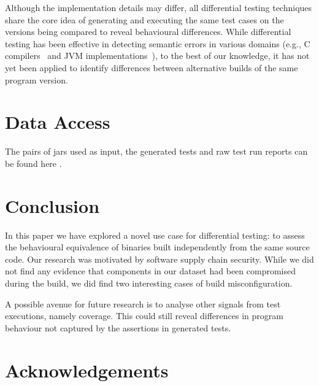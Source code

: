 \documentclass[conference]{IEEEtran}
\newcommand{\jens}[1]{\textbf{\textcolor{magenta}{[ \ding{46}Jens: #1]}}}
\renewcommand{\jens}[1]{}
\begin{document}
Although the implementation details may differ, all differential testing techniques share the core idea of generating and executing the same test cases on the versions being compared to reveal behavioural differences. %
While differential testing has been effective in detecting semantic errors in various domains (e.g., C compilers~\cite{Yang:compiler:pldi:2011} and JVM implementations~\cite{Chen:jvmdiff:pldi:2016}), to the best of our knowledge, it has not yet been applied to identify differences between alternative builds of the same program version.


\section{Data Access}
\label{sec:dataaccess}

The pairs of jars used as input, the generated tests and raw test run reports can be found here \jens{@Tim todo}. 


\section{Conclusion}
\label{sec:conclusion}

In this paper we have explored a novel use case for differential testing: to assess the behavioural equivalence of binaries built independently from the same source code. Our research was motivated by software supply chain security. While we did not find any evidence that components in our dataset had been compromised during the build, we did find two interesting cases of build misconfiguration.  

A possible avenue for future research is to analyse other signals from test executions, namely coverage. This could still reveal differences in program behaviour not captured by the assertions in generated tests. 

\section*{Acknowledgements}




\end{document}
